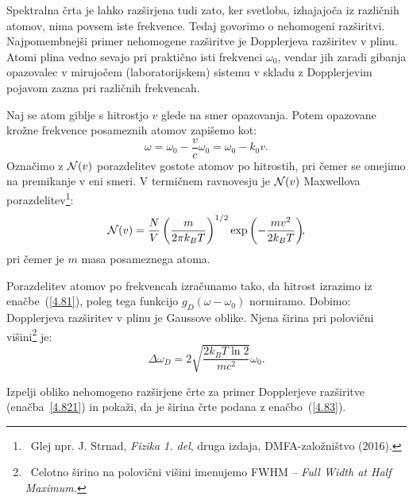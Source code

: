 Spektralna črta je lahko razširjena tudi zato, ker svetloba, izhajajoča iz različnih
atomov, nima povsem iste frekvence. Tedaj govorimo o nehomogeni 
razširitvi.
Najpomembnejši primer nehomogene razširitve je Dopplerjeva 
 razširitev v plinu. 
Atomi plina vedno sevajo pri praktično isti frekvenci $\omega_0$, vendar jih zaradi gibanja
opazovalec v mirujočem (laboratorijskem) sistemu v skladu z Dopplerjevim pojavom 
zazna pri različnih frekvencah. 

Naj se atom giblje s hitrostjo $v$ glede na smer opazovanja. Potem opazovane krožne 
frekvence posameznih atomov zapišemo kot:
\begin{equation}
\omega=\omega_{0}-\frac{v}{c}\omega_{0}=\omega_{0}-k_{0}v.
\label{4.81}
\end{equation}
Označimo z ${\cal N}(v)$ porazdelitev gostote atomov po hitrostih, pri čemer se omejimo 
na premikanje v eni smeri. V termičnem ravnovesju je ${\cal N}(v)$
Maxwellova porazdelitev\footnote{~Glej npr. J. Strnad, 
{\it Fizika 1. del}, druga izdaja, DMFA-založništvo (2016).}:
\begin{equation}
{\cal N}(v)=\frac{N}{V}\left(\frac{m}{2\pi k_{B}T}\right)^{1/2}
\exp \left(-\frac{mv^{2}}{2k_{B}T}\right)\!\!,
\label{4.82}
\end{equation}
pri čemer je $m$ masa posameznega atoma.

Porazdelitev atomov po frekvencah izračunamo tako, da hitrost izrazimo
iz enačbe~(\ref{4.81}), poleg tega funkcijo $g_{D}(\omega-\omega_0)$
normiramo. Dobimo:
Dopplerjeva razširitev v plinu je Gaussove oblike.
Njena širina pri polovični 
višini\footnote{~Celotno širino na polovični višini imenujemo FWHM -- \it{Full Width at Half Maximum}.} je:
\begin{equation} 
\Delta\omega_{D}=2 \sqrt{\frac{2k_{B}T \ln 2}{mc^{2}}}\omega_{0}.
\label{4.83}
\end{equation}
\begin{naloga}
Izpelji obliko nehomogeno razširjene črte za primer Dopplerjeve razširitve (enačba~\ref{4.821})
in pokaži, da je širina črte podana z enačbo~(\ref{4.83}).
\end{naloga}

